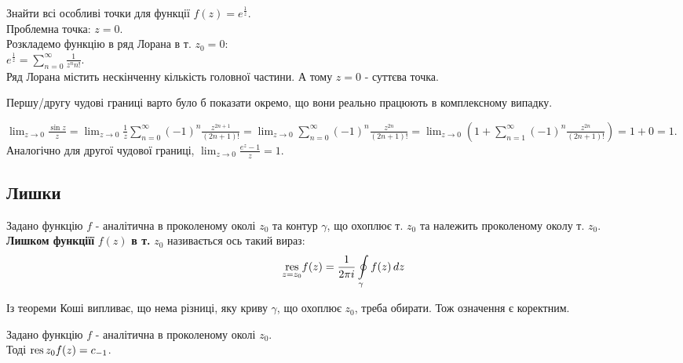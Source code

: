 \documentclass{math_library}
\begin{document}
\begin{example}
Знайти всі особливі точки для функції $\displaystyle f(z) = e^{\textstyle \frac{1}{z}}$.\\
Проблемна точка: $z = 0$.\\
Розкладемо функцію в ряд Лорана в т. $z_0 = 0$:\\
$\displaystyle e^{\textstyle \frac{1}{z}} = \sum_{n=0}^{\infty} \frac{1}{z^n n!}$.\\
Ряд Лорана містить нескінченну кількість головної частини. А тому $z = 0$ - суттєва точка.
\end{example}

\begin{remark}
Першу/другу чудові границі варто було б показати окремо, що вони реально працюють в комплексному випадку.
\end{remark}

$\displaystyle \lim_{z \to 0} \frac{\sin z}{z} = \lim_{z \to 0} \frac{1}{z} \sum_{n=0}^{\infty} (-1)^n \frac{z^{2n+1}}{(2n+1)!} = \lim_{z \to 0} \sum_{n=0}^{\infty} (-1)^n \frac{z^{2n}}{(2n+1)!} = \lim_{z \to 0} \left(1 + \sum_{n=1}^{\infty} (-1)^n \frac{z^{2n}}{(2n+1)!}\right) = 1 + 0 = 1$.\\
Аналогічно для другої чудової границі, $\displaystyle \lim_{z \to 0} \frac{e^z - 1}{z} = 1$.

\subsection{Лишки}
\begin{definition}
Задано функцію $f$ - аналітична в проколеному околі $z_0$ та контур $\gamma$, що охоплює т. $z_0$ та належить проколеному околу т. $z_0$.\\
\textbf{Лишком функціїї} $f(z)$ \textbf{в т.} $z_0$ називається ось такий вираз:
\begin{align*}
 \underset{z = z_0}{\textrm{res}} f(z) = \frac{1}{2 \pi i} \oint\displaylimits_{\gamma} f(z) \,dz
\end{align*}
\end{definition}

\begin{remark}
Із теореми Коші випливає, що нема різниці, яку криву $\gamma$, що охоплює $z_0$, треба обирати. Тож означення є коректним.
\end{remark}

\begin{theorem}
Задано функцію $f$ - аналітична в проколеному околі $z_0$. \\
Тоді $\displaystyle \operatorname*{res}{z_0}{f(z)} = c_{-1}$.
\end{theorem}
\end{document}
